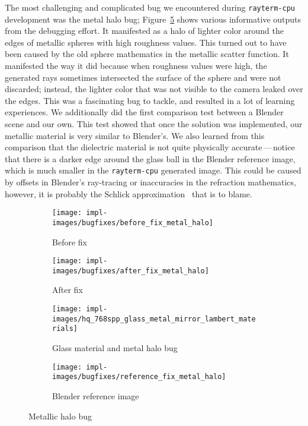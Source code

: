 The most challenging and complicated bug we encountered during \texttt{rayterm-cpu} development was the metal halo bug; Figure~\ref{fig:rayterm-cpu_halo_bug} shows various informative outputs from the debugging effort.
It manifested as a halo of lighter color around the edges of metallic spheres with high roughness values.
This turned out to have been caused by the old sphere mathematics in the metallic scatter function.
It manifested the way it did because when roughness values were high, the generated rays sometimes intersected the surface of the sphere and were not discarded; instead, the lighter color that was not visible to the camera leaked over the edges.
This was a fascinating bug to tackle, and resulted in a lot of learning experiences.
We additionally did the first comparison test between a Blender~\cite{blender} scene and our own.
This test showed that once the solution was implemented, our metallic material is very similar to Blender's.
We also learned from this comparison that the dielectric material is not quite physically accurate\,---\,notice that there is a darker edge around the glass ball in the Blender reference image, which is much smaller in the \texttt{rayterm-cpu} generated image.
This could be caused by offsets in Blender's ray-tracing or inaccuracies in the refraction mathematics, however, it is probably the Schlick approximation~\cite{schlick1994inexpensive} that is to blame.

\vspace{0.3em}
\begin{figure}[htb]
  \centering
  \begin{subfigure}[htb]{0.45\textwidth}
    \texttt{[image: impl-images/bugfixes/before\_fix\_metal\_halo]}
    \caption{Before fix}
\label{fig:rayterm-cpu_halo_before}
  \end{subfigure}
  \begin{subfigure}[htb]{0.45\textwidth}
    \texttt{[image: impl-images/bugfixes/after\_fix\_metal\_halo]}
    \caption{After fix}
\label{fig:rayterm-cpu_halo_after}
  \end{subfigure}
  \begin{subfigure}[htb]{0.45\textwidth}
    \texttt{[image: impl-images/hq\_768spp\_glass\_metal\_mirror\_lambert\_materials]}
    \caption{Glass material and metal halo bug}
\label{fig:rayterm-cpu_glass_metal_bug}
  \end{subfigure}
  \begin{subfigure}[htb]{0.45\textwidth}
    \texttt{[image: impl-images/bugfixes/reference\_fix\_metal\_halo]}
    \caption{Blender reference image}
\label{fig:rayterm-cpu_halo_reference}
  \end{subfigure}
  \caption{Metallic halo bug}
\label{fig:rayterm-cpu_halo_bug}
\end{figure}

